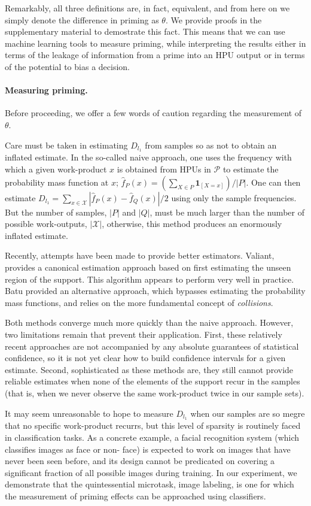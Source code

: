 \documentclass[12pt]{article}
\begin{document}
Remarkably, all three definitions are, in fact, equivalent, and from here on
we simply denote the difference in priming as $\theta$.  We provide proofs
in the supplementary material to demostrate this fact.  This means that we
can use machine learning tools to measure priming, while interpreting the
results either in terms of the  leakage of information from a prime into an 
HPU output or in terms of the potential to bias a decision.

\paragraph{Measuring priming.}
Before proceeding, we offer a few words of caution regarding the measurement 
of $\theta$.

Care must be taken in estimating $D_{l_1}$ from samples so as not to obtain
an inflated estimate. In the so-called naive approach, one uses the frequency 
with which a given work-product $x$ is obtained from HPUs in $\mathcal{P}$ to 
estimate the probability mass function at $x$; 
$\hat{f}_P(x) = (\sum_{X\in P} \mathbf{1}_{[X=x]})/|P|$.
One can then estimate 
$D_{l_1} = \sum_{x \in \mathcal{X}} \left|\hat{f}_P(x) - \hat{f}_Q(x) \right|/2$ using only the sample frequencies. But the number of samples, $|P|$ and 
$|Q|$, must be much larger than the number of possible work-outputs, 
$|\mathcal{X}|$, otherwise, this method produces an enormously inflated 
estimate.

Recently, attempts have been made to provide better estimators. Valiant, 
provides a canonical estimation approach based on first estimating the unseen 
region of the support. This algorithm appears to perform very well in practice.
Batu provided an alternative approach, which bypasses estimating the 
probability mass functions, and relies on the more fundamental concept of 
\textit{collisions}.

Both methods converge much more quickly than the naive approach. However, two 
limitations remain that prevent their application. First, these relatively 
recent approaches are not accompanied by any absolute guarantees of 
statistical confidence, so it is not yet clear how to build confidence 
intervals for a given estimate. Second, sophisticated as these methods are, 
they still cannot provide reliable estimates when none of the elements of the 
support recur in the samples (that is, when we never observe the same 
work-product twice in our sample sets).

It may seem unreasonable to hope to measure $D_{l_1}$ when our samples are so 
megre that no specific work-product recurrs, but this level of sparsity is 
routinely faced in classification tasks. As a concrete example, a facial 
recognition 
system (which classifies images as face or non- face) is expected to work on 
images that have never been seen before, and its design cannot be predicated on
covering a significant fraction of all possible images during training. In our 
experiment, we demonstrate that the quintessential microtask, image labeling, 
is one for which the measurement of priming effects can be approached using 
classifiers.
\end{document}
